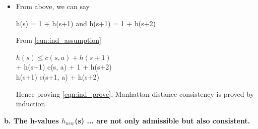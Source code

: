 \documentclass[a4 paper]{article}
\begin{document}
\begin{itemize}
    \item From above, we can say \\
    \begin{center}
    h(s) = 1 + h(s+1) and h(s+1) = 1 + h(s+2) \\
    \end{center}
    From \ref {eqn:ind_assumption} \\
    \begin{center}
    $h(s) \leq c(s, a) + h(s+1)$ \\
     + h(s+1) \leq c(s, a) + 1 + h(s+2) \\
    \therefore h(s+1) \leq c(s+1, a) + h(s+2) \\
    \end{center}
    Hence proving \ref {eqn:ind_prove}, Manhattan distance consistency is proved by induction.
    
    
\end{itemize}

\textbf{\hspace{-15pt}b. The h-values $h_{new}$(s) ... are not only admissible but also consistent.}
\end{document}
